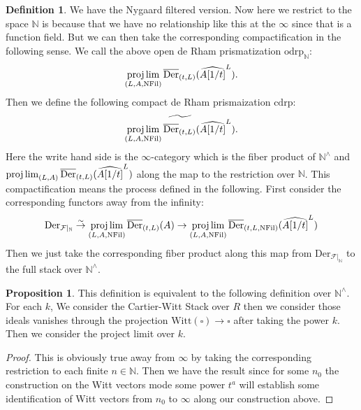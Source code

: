 \documentclass[12pt]{article}
\theoremstyle{definition}
\newtheorem{definition}{Definition}
\newtheorem{proposition}{Proposition}
\begin{document}
\begin{definition}
We have the Nygaard filtered version. Now here we restrict to the space $\mathbb{N}$ is because that we have no relationship like this at the $\infty$ since that is a function field. But we can then take the corresponding compactification in the following sense. We call the above open de Rham prismatization $\mathrm{odrp}_\mathbb{N}$:
\begin{align}
\projlim_{(L,A,\mathrm{NFil})}\overline{\mathrm{Der}}_{(t,L)}(\widehat{A[1/t]}^{L}).
\end{align}
Then we define the following compact de Rham prismaization $\mathrm{cdrp}$:
\begin{align}
\widetilde{\projlim_{(L,A,\mathrm{NFil})}\overline{\mathrm{Der}}_{(t,L)}(\widehat{A[1/t]}^{L})}.
\end{align}
Here the write hand side is the $\infty$-category which is the fiber product of $\mathbb{N}^\wedge$ and $\projlim_{(L,A)}\overline{\mathrm{Der}}_{(t,L)}(\widehat{A[1/t]}^{L})$ along the map to the restriction over $\mathbb{N}$. 
This compactification means the process defined in the following. First consider the corresponding functors away from the infinity:
\begin{align}
\mathrm{Der}_{\mathcal{F}|_{\mathbb{N}}}\overset{\sim}{\rightarrow} \projlim_{(L,A,\mathrm{NFil})}\overline{\mathrm{Der}}_{(t,L)}(A) \overset{}{\rightarrow} \projlim_{(L,A,\mathrm{NFil})}\overline{\mathrm{Der}}_{(t,L,\mathrm{NFil})}(\widehat{A[1/t]}^L)
\end{align}
Then we just take the corresponding fiber product along this map from $\mathrm{Der}_{\mathcal{F}|_{\mathbb{N}}}$ to the full stack over $\mathbb{N}^\wedge$.
\end{definition}


\begin{proposition}
This definition is equivalent to the following definition over $\mathbb{N}^\wedge$. For each $k$, We consider the Cartier-Witt Stack over $R$ then we consider those ideals vanishes through the projection $\mathrm{Witt}(\square)\rightarrow \square$ after taking the power $k$. Then we consider the project limit over $k$.
\end{proposition}

\begin{proof}
This is obviously true away from $\infty$ by taking the corresponding restriction to each finite $n\in \mathbb{N}$. Then we have the result since for some $n_0$ the construction on the Witt vectors mode some power $t^a$ will establish some identification of Witt vectors from $n_0$ to $\infty$ along our construction above. 
\end{proof}
\end{document}
